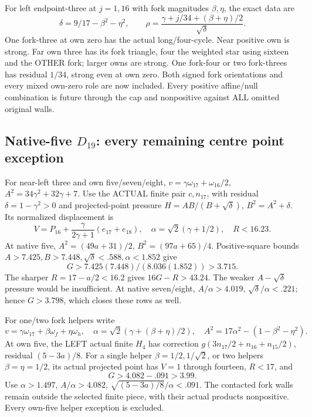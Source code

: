 \documentclass[11pt]{article}
\theoremstyle{definition}
\theoremstyle{remark}
\begin{document}
For left endpoint-three at
\(j=1,16\) with fork magnitudes
\(\beta,\eta\), the exact data
are
\[
 \delta=9/17-\beta^2-\eta^2,\qquad
               \rho=\frac{\gamma+j/34+(\beta+\eta)/2}{\sqrt\delta}.
\]
One fork-three at own zero
has the actual long/four-cycle.
Near positive own is strong.
Far own three has its fork
triangle, four the weighted
star using sixteen and the
OTHER fork; larger owns are
strong.
One fork-four or two fork-threes
has residual \(1/34\), strong
even at own zero.
Both signed fork orientations
and every mixed own-zero role
are now included.
Every positive affine/null
combination is future through
the cap and nonpositive against
ALL omitted original walls.


\subsection[Native-five D19: every remaining centre point exception]{Native-five \(D_{19}\): every remaining centre point exception}
\label{app:exact19:Dfivecentrepoints}

For near-left three and own
five/seven/eight,
\(v=\gamma\omega_{17}+\omega_{16}/2\),
\(A^2=34\gamma^2+32\gamma+7\).
Use the ACTUAL finite pair
\(c,n_{17}\), with residual
\(\delta=1-\gamma^2>0\) and
projected-point pressure
\(H=AB/(B+\sqrt\delta)\),
\(B^2=A^2+\delta\).
Its normalized displacement is
\[
 V=P_{16}+\frac{\gamma}{2\gamma+1}(e_{17}+e_{18}),
              \quad\alpha=\sqrt2(\gamma+1/2),\quad R<16.23 .
\]
At native five,
\(A^2=(49a+31)/2\),
\(B^2=(97a+65)/4\).
Positive-square bounds
\(A>7.425,B>7.448,\sqrt\delta<.588,\alpha<1.852\)
give
\[
                      G>7.425(7.448)/(8.036(1.852))>3.715 .
\]
The sharper \(R=17-a/2<16.2\)
gives \(16G-R>43.24\).
The weaker \(A-\sqrt\delta\)
pressure would be insufficient.
At native seven/eight,
\(A/\alpha>4.019\),
\(\sqrt\delta/\alpha<.221\);
hence \(G>3.798\), which closes
these rows as well.

For one/two fork helpers write
\[
 v=\gamma\omega_{17}+\beta\omega_f+\eta\omega_h,\quad
 \alpha=\sqrt2(\gamma+(\beta+\eta)/2),\quad
                    A^2=17\alpha^2-(1-\beta^2-\eta^2).
\]
At own five, the LEFT actual
finite \(H_4\) has correction
\(g(3n_{17}/2+n_{16}+n_{15}/2)\),
residual \((5-3a)/8\).
For a single helper
\(\beta=1/2,1/\sqrt2\), or
two helpers \(\beta=\eta=1/2\),
its actual projected point has
\(V=1\) through fourteen,
\(R<17\), and
\[
                         G>4.082-.091>3.99 .
\]
Use \(\alpha>1.497\),
\(A/\alpha>4.082\),
\(\sqrt{(5-3a)/8}/\alpha<.091\).
The contacted fork walls remain
outside the selected finite
piece, with their actual
products nonpositive.
Every own-five helper exception
is excluded.
\end{document}
